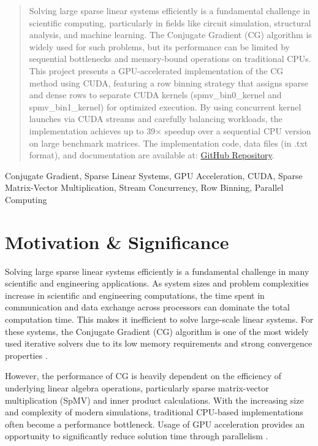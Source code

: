\documentclass[conference]{IEEEtran}
\begin{document}
\begin{abstract}
Solving large sparse linear systems efficiently is a fundamental challenge in scientific computing, particularly in fields like circuit simulation, structural analysis, and machine learning. The Conjugate Gradient (CG) algorithm is widely used for such problems, but its performance can be limited by sequential bottlenecks and memory-bound operations on traditional CPUs. This project presents a GPU-accelerated implementation of the CG method using CUDA, featuring a row binning strategy that assigns sparse and dense rows to separate CUDA kernels (spmv\_bin0\_kernel and spmv\_bin1\_kernel) for optimized execution. By using concurrent kernel launches via CUDA streams and carefully balancing workloads, the implementation achieves up to 39× speedup over a sequential CPU version on large benchmark matrices. The implementation code, data files (in .txt format), and documentation are available at: \href{https://github.com/yerminal/MMI713-Project}{GitHub Repository}.
\end{abstract}

\begin{IEEEkeywords}
Conjugate Gradient, Sparse Linear Systems, GPU Acceleration, CUDA, Sparse Matrix-Vector Multiplication, Stream Concurrency, Row Binning, Parallel Computing
\end{IEEEkeywords}

\section{Motivation \& Significance}
Solving large sparse linear systems efficiently is a fundamental challenge in many scientific and engineering applications. As system sizes and problem complexities increase in scientific and engineering computations, the time spent in communication and data exchange across processors can dominate the total computation time. This makes it inefficient to solve large-scale linear systems. For these systems, the Conjugate Gradient (CG) algorithm is one of the most widely used iterative solvers due to its low memory requirements and strong convergence properties \cite{b1}.

However, the performance of CG is heavily dependent on the efficiency of underlying linear algebra operations, particularly sparse matrix-vector multiplication (SpMV) and inner product calculations. With the increasing size and complexity of modern simulations, traditional CPU-based implementations often become a performance bottleneck. Usage of GPU acceleration provides an opportunity to significantly reduce solution time through parallelism \cite{b1}.
\end{document}
